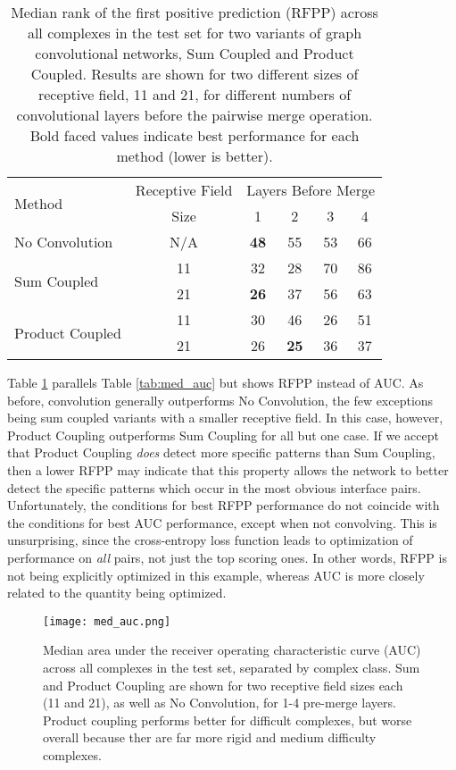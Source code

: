 \begin{table}
	\begin{center}
		\begin{tabular}{lccccc}
			\toprule
			\multirow{2}{*}{Method} &
			Receptive Field & \multicolumn{4}{c}{Layers Before Merge} \\
			& Size & 1 & {2} & {3} & {4} \\
			\midrule
			No Convolution & N/A & \textbf{48} & 55 & 53 & 66 \\\cline{1-6}
			\multirow{2}{*}{Sum Coupled} & 11 & 32 & 28 & 70 & 86 \\
			& 21 & \textbf{26} & 37 & 56 & 63 \\\cline{1-6}
			\multirow{2}{*}{Product Coupled} & 11 & 30 & 46 & 26 & 51 \\
			& 21 & 26 & \textbf{25} & 36 & 37 \\
			\bottomrule
		\end{tabular}
		\caption{Median rank of the first positive prediction (RFPP) across all complexes in the test set for two variants of graph convolutional networks, Sum Coupled and Product Coupled. Results are shown for two different sizes of receptive field, 11 and 21, for different numbers of convolutional layers before the pairwise merge operation. Bold faced values indicate best performance for each method (lower is better).}
		\label{tab:med_rfpp}
	\end{center}
\end{table}

Table \ref{tab:med_rfpp} parallels Table \ref{tab:med_auc} but shows RFPP instead of AUC.
As before, convolution generally outperforms No Convolution, the few exceptions being sum coupled variants with a smaller receptive field.
In this case, however, Product Coupling outperforms Sum Coupling for all but one case.
If we accept that Product Coupling \emph{does} detect more specific patterns than Sum Coupling, then a lower RFPP may indicate that this property allows the network to better detect the specific patterns which occur in the most  obvious interface pairs.
Unfortunately, the conditions for best RFPP performance do not coincide with the conditions for best AUC performance, except when not convolving.
This is unsurprising, since the cross-entropy loss function leads to optimization of performance on \emph{all} pairs, not just the top scoring ones.
In other words, RFPP is not being explicitly optimized in this example, whereas AUC is more closely related to the quantity being optimized.

\begin{figure}
	\texttt{[image: med\_auc.png]}
	\caption{Median area under the receiver operating characteristic curve (AUC) across all complexes in the test set, separated by complex class. Sum and Product Coupling are shown for two receptive field sizes each (11 and 21), as well as No Convolution, for 1-4 pre-merge layers. Product coupling performs better for difficult complexes, but worse overall because ther are far more rigid and medium difficulty complexes.
		\label{fig:med_auc}}
\end{figure}


